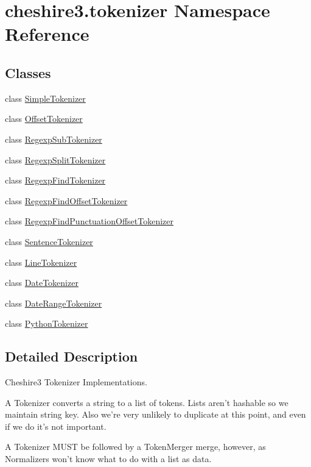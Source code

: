 \hypertarget{namespacecheshire3_1_1tokenizer}{\section{cheshire3.\-tokenizer Namespace Reference}
\label{namespacecheshire3_1_1tokenizer}
}
\subsection*{Classes}
\begin{DoxyCompactItemize}
\item 
class \hyperlink{classcheshire3_1_1tokenizer_1_1_simple_tokenizer}{Simple\-Tokenizer}
\item 
class \hyperlink{classcheshire3_1_1tokenizer_1_1_offset_tokenizer}{Offset\-Tokenizer}
\item 
class \hyperlink{classcheshire3_1_1tokenizer_1_1_regexp_sub_tokenizer}{Regexp\-Sub\-Tokenizer}
\item 
class \hyperlink{classcheshire3_1_1tokenizer_1_1_regexp_split_tokenizer}{Regexp\-Split\-Tokenizer}
\item 
class \hyperlink{classcheshire3_1_1tokenizer_1_1_regexp_find_tokenizer}{Regexp\-Find\-Tokenizer}
\item 
class \hyperlink{classcheshire3_1_1tokenizer_1_1_regexp_find_offset_tokenizer}{Regexp\-Find\-Offset\-Tokenizer}
\item 
class \hyperlink{classcheshire3_1_1tokenizer_1_1_regexp_find_punctuation_offset_tokenizer}{Regexp\-Find\-Punctuation\-Offset\-Tokenizer}
\item 
class \hyperlink{classcheshire3_1_1tokenizer_1_1_sentence_tokenizer}{Sentence\-Tokenizer}
\item 
class \hyperlink{classcheshire3_1_1tokenizer_1_1_line_tokenizer}{Line\-Tokenizer}
\item 
class \hyperlink{classcheshire3_1_1tokenizer_1_1_date_tokenizer}{Date\-Tokenizer}
\item 
class \hyperlink{classcheshire3_1_1tokenizer_1_1_date_range_tokenizer}{Date\-Range\-Tokenizer}
\item 
class \hyperlink{classcheshire3_1_1tokenizer_1_1_python_tokenizer}{Python\-Tokenizer}
\end{DoxyCompactItemize}


\subsection{Detailed Description}
\begin{DoxyVerb}Cheshire3 Tokenizer Implementations.

A Tokenizer converts a string to a list of tokens. Lists aren't hashable so we
maintain string key. Also we're very unlikely to duplicate at this point, and
even if we do it's not important.

A Tokenizer MUST be followed by a TokenMerger merge, however, as Normalizers
won't know what to do with a list as data.
\end{DoxyVerb}
 